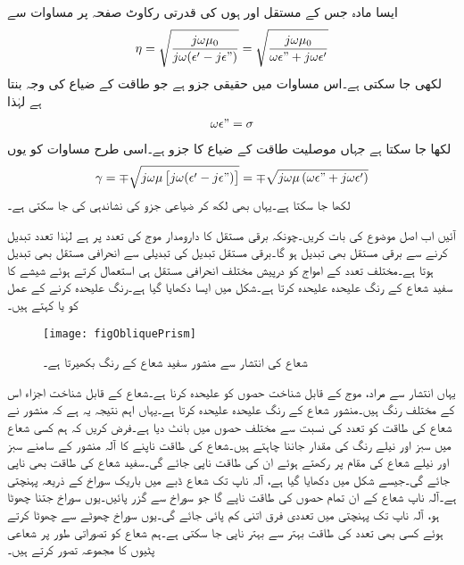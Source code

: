 ایسا مادہ جس کے مستقل  اور  ہوں کی قدرتی رکاوٹ صفحہ  پر مساوات  سے
\begin{align}
\eta=\sqrt{\frac{j \omega \mu_0}{j \omega (\epsilon'-j\epsilon")}}=\sqrt{\frac{j\omega \mu_0}{\omega \epsilon"+j\omega \epsilon'}}
\end{align}
لکھی جا سکتی ہے۔اس مساوات میں حقیقی جزو  ہے جو طاقت کے ضیاع کی وجہ بنتا ہے لہٰذا 
\begin{align}
\omega \epsilon"=\sigma
\end{align}
لکھا جا سکتا ہے جہاں موصلیت طاقت کے ضیاع کا جزو ہے۔اسی طرح مساوات  کو یوں
\begin{align}
\gamma=\mp \sqrt{j \omega \mu  \left[j \omega (\epsilon'-j\epsilon" )\right]}=\mp \sqrt{j \omega \mu  \left(\omega \epsilon"+j\omega\epsilon' \right)}
\end{align}
لکھا جا سکتا ہے۔یہاں بھی  لکھ کر ضیاعی جزو کی نشاندہی کی جا سکتی ہے۔

آئیں اب اصل موضوع کی بات کریں۔چونکہ برقی مستقل کا دارومدار موج کی تعدد پر ہے لہٰذا تعدد تبدیل  کرنے سے برقی مستقل بھی تبدیل ہو گا۔برقی مستقل تبدیل کی تبدیلی سے انحرافی مستقل بھی تبدیل ہوتا ہے۔مختلف تعدد کے امواج کو درپیش مختلف انحرافی مستقل ہی استعمال کرتے ہوئے شیشے کا   سفید شعاع کے رنگ علیحدہ علیحدہ کرتا ہے۔شکل  میں ایسا دکھایا گیا ہے۔رنگ علیحدہ کرنے کے عمل کو  یا  کہتے ہیں۔

\begin{figure}
\centering
\texttt{[image: figObliquePrism]}
\caption{شعاع کی انتشار سے منشور سفید شعاع کے رنگ بکھیرتا ہے۔}
\label{شکل_ترچھی_انتشار_بذریعہ_منشور}
\end{figure}
یہاں انتشار سے مراد، موج کے قابل شناخت حصوں کو علیحدہ کرنا ہے۔شعاع کے قابل شناخت اجزاء اس کے مختلف رنگ ہیں۔منشور شعاع کے رنگ علیحدہ علیحدہ کرتا ہے۔یہاں اہم نتیجہ یہ ہے کہ منشور نے شعاع کی طاقت کو تعدد کی نسبت سے مختلف حصوں میں بانٹ دیا ہے۔فرض کریں کہ ہم کسی شعاع میں سبز اور نیلے رنگ کی مقدار جاننا چاہتے ہیں۔شعاع کی طاقت ناپنے کا آلہ منشور کے سامنے سبز اور نیلے شعاع کی مقام پر رکھتے ہوئے ان کی طاقت ناپی جائے گی۔سفید شعاع کی طاقت بھی ناپی جائے گی۔جیسے شکل میں دکھایا گیا ہے، آلہ ناپ تک شعاع ڈبے میں باریک سوراخ کے ذریعہ پہنچتی ہے۔آلہ ناپ شعاع کے ان تمام حصوں کی طاقت ناپے گا جو سوراخ سے گزر پائیں۔یوں سوراخ جتنا چھوٹا ہو، آلہ ناپ تک پہنچتی  میں تعددی فرق اتنی کم پائی جائے گی۔یوں سوراخ چھوٹے سے چھوٹا کرتے ہوئے کسی بھی تعدد کی طاقت بہتر سے بہتر ناپی جا سکتی ہے۔ہم شعاع کو تصوراتی طور پر شعاعی پٹیوں کا مجموعہ تصور کرتے ہیں۔

